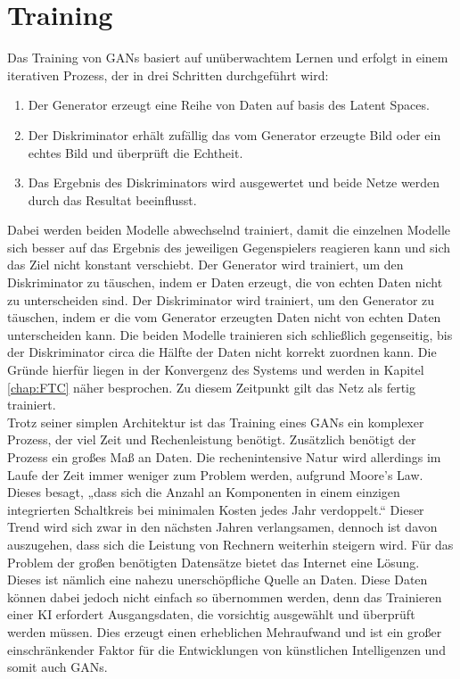 \section{Training}

\noindent Das Training von \acp{GAN} basiert auf unüberwachtem Lernen und erfolgt in einem iterativen Prozess, der in drei Schritten durchgeführt wird: \\
\begin{enumerate}
    \item Der Generator erzeugt eine Reihe von Daten auf basis des Latent Spaces.
    \item Der Diskriminator erhält zufällig das vom Generator erzeugte Bild oder ein echtes Bild und überprüft die Echtheit.
    \item Das Ergebnis des Diskriminators wird ausgewertet und beide Netze werden durch das Resultat beeinflusst. \\
\end{enumerate}

\noindent Dabei werden beiden Modelle abwechselnd trainiert, damit die einzelnen Modelle sich besser auf das Ergebnis des jeweiligen Gegenspielers reagieren kann und sich das Ziel nicht konstant verschiebt. Der Generator wird trainiert, um den Diskriminator zu täuschen, indem er Daten erzeugt, die von echten Daten nicht zu unterscheiden sind. Der Diskriminator wird trainiert, um den Generator zu täuschen, indem er die vom Generator erzeugten Daten nicht von echten Daten unterscheiden kann. Die beiden Modelle trainieren sich schließlich gegenseitig, bis der Diskriminator circa die Hälfte der Daten nicht korrekt zuordnen kann. Die Gründe hierfür liegen in der Konvergenz des Systems und werden in Kapitel \ref{chap:FTC} näher besprochen. Zu diesem Zeitpunkt gilt das Netz als fertig trainiert\cite{training}. \\

\noindent Trotz seiner simplen Architektur ist das Training eines \acp{GAN} ein komplexer Prozess, der viel Zeit und Rechenleistung benötigt. Zusätzlich benötigt der Prozess ein großes Maß an Daten. Die rechenintensive Natur wird allerdings im Laufe der Zeit immer weniger zum Problem werden, aufgrund Moore's Law. Dieses besagt, „dass sich die Anzahl an Komponenten in einem einzigen integrierten Schaltkreis bei minimalen Kosten jedes Jahr verdoppelt.“\cite{moore} Dieser Trend wird sich zwar in den nächsten Jahren verlangsamen, dennoch ist davon auszugehen, dass sich die Leistung von Rechnern weiterhin steigern wird. Für das Problem der großen benötigten Datensätze bietet das Internet eine Lösung. Dieses ist nämlich eine nahezu unerschöpfliche Quelle an Daten. Diese Daten können dabei jedoch nicht einfach so übernommen werden, denn das Trainieren einer KI erfordert Ausgangsdaten, die vorsichtig ausgewählt und überprüft werden müssen. Dies erzeugt einen erheblichen Mehraufwand und ist ein großer einschränkender Faktor für die Entwicklungen von künstlichen Intelligenzen und somit auch \acp{GAN}.\\

\newpage
